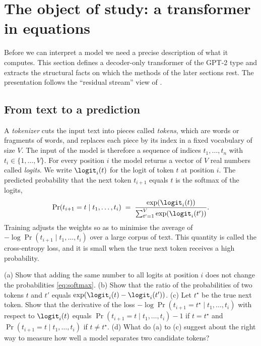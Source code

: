 \section{The object of study: a transformer in equations}
\label{sec:transformer}

Before we can interpret a model we need a precise description of what it computes. This section defines a
decoder-only transformer of the GPT-2 type \citep{vaswani2017attention,radford2019language} and extracts the
structural facts on which the methods of the later sections rest. The presentation follows the ``residual
stream'' view of \citet{elhage2021mathematical}.

\subsection{From text to a prediction}

A \emph{tokenizer} cuts the input text into pieces called \emph{tokens}, which are words or fragments of words,
and replaces each piece by its index in a fixed vocabulary of size $V$. The input of the model is therefore a
sequence of indices $t_1,\dots,t_n$ with $t_i\in\{1,\dots,V\}$. For every position $i$ the model returns a vector
of $V$ real numbers called \emph{logits}. We write $\logit_i(t)$ for the logit of token $t$ at position $i$. The
predicted probability that the next token $t_{i+1}$ equals $t$ is the softmax of the logits,
\begin{equation}\label{eq:softmax}
\Pr(t_{i+1}=t \mid t_1,\dots,t_i) \;=\; \frac{\exp(\logit_i(t))}{\sum_{t'=1}^{V}\exp(\logit_i(t'))} .
\end{equation}
Training adjusts the weights so as to minimise the average of $-\log\Pr(t_{i+1}\mid t_1,\dots,t_i)$ over a large
corpus of text. This quantity is called the cross-entropy loss, and it is small when the true next token receives a
high probability.

\begin{exercise}\label{ex:softmax}
(a) Show that adding the same number to all logits at position $i$ does not change the probabilities
\eqref{eq:softmax}. (b) Show that the ratio of the probabilities of two tokens $t$ and $t'$ equals
$\exp(\logit_i(t)-\logit_i(t'))$. (c) Let $t^\star$ be the true next token. Show that the derivative of the loss
$-\log\Pr(t_{i+1}=t^\star\mid t_1,\dots,t_i)$ with respect to $\logit_i(t)$ equals
$\Pr(t_{i+1}=t\mid t_1,\dots,t_i)-1$ if $t=t^\star$ and $\Pr(t_{i+1}=t\mid t_1,\dots,t_i)$ if $t\ne t^\star$.
(d) What do (a) to (c) suggest about the right way to measure how well a model separates two candidate tokens?
\end{exercise}

